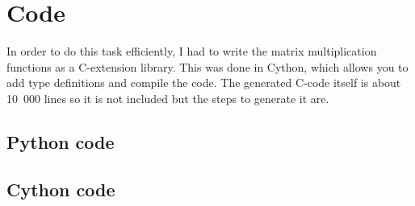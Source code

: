 \documentclass[12pt,a4paper]{article}
\begin{document}
\newpage
\appendix
\section{Code}
In order to do this task efficiently, I had to write the matrix multiplication functions as a C-extension library. This was done in Cython, which allows you to add type definitions and compile the code. The generated C-code itself is about 10~000 lines so it is not included but the steps to generate it are.
\subsection{Python code}
\begin{changemargin}{-3cm}{0.5cm}

\end{changemargin}
\newpage
\begin{changemargin}{-3cm}{0.5cm}

\end{changemargin}
\newpage
\subsection{Cython code}
\begin{changemargin}{-3cm}{0.5cm}

\end{changemargin}
\end{document}
